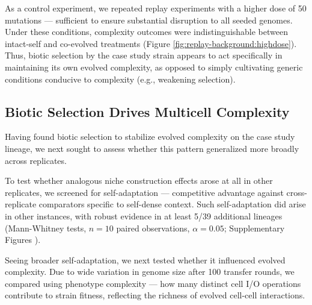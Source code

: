 As a control experiment, we repeated replay experiments with a higher dose of 50 mutations --- sufficient to ensure substantial disruption to all seeded genomes.
Under these conditions, complexity outcomes were indistinguishable between intact-self and co-evolved treatments (Figure \ref{fig:replay-background:highdose}).
Thus, biotic selection by the case study strain appears to act specifically in maintaining its own evolved complexity, as opposed to simply cultivating generic conditions conducive to complexity (e.g., weakening selection).


\subsection{Biotic Selection Drives Multicell Complexity}
\label{sec:biotic-selection-drives-multicell-complexity}



Having found biotic selection to stabilize evolved complexity on the case study lineage, we next sought to assess whether this pattern generalized more broadly across replicates.

To test whether analogous niche construction effects arose at all in other replicates, we screened for self-adaptation --- competitive advantage against cross-replicate comparators specific to self-dense context.
Such self-adaptation did arise in other instances, with robust evidence in at least 5/39 additional lineages (Mann-Whitney tests, $n=10$ paired observations, $\alpha = 0.05$; Supplementary Figures ).

Seeing broader self-adaptation, we next tested whether it influenced evolved complexity.
Due to wide variation in genome size after 100 transfer rounds, we compared using phenotype complexity --- how many distinct cell I/O operations contribute to strain fitness, reflecting the richness of evolved cell-cell interactions.

